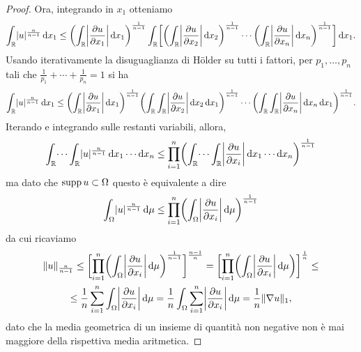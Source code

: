 \begin{proof}
    Ora, integrando in $x_1$ otteniamo
    \begin{equation}
        \int_\R\abs{u}^\frac{n}{n-1}\,\dd x_1\le
        \biggl(\int_\R\abs[\bigg]{\drp{u}{x_1}}\,\dd x_1\biggr)^\frac1{n-1}
        \int_\R\biggl[
            \biggl(\int_\R\abs[\bigg]{\drp{u}{x_2}}\,\dd x_2\biggr)^\frac1{n-1}
            \dotsm
            \biggl(\int_\R\abs[\bigg]{\drp{u}{x_n}}\,\dd x_n\biggr)^\frac1{n-1}
        \biggr]\,\dd x_1.
    \end{equation}
    Usando iterativamente la disuguaglianza di Hölder su tutti i fattori, per $p_1,\dotsc,p_n$ tali che $\frac1{p_1}+\dotsb+\frac1{p_n}=1$ si ha
    \begin{equation}
        \int_\R\abs{u}^\frac{n}{n-1}\,\dd x_1\le
        \biggl(\int_\R\abs[\bigg]{\drp{u}{x_1}}\,\dd x_1\biggr)^\frac1{n-1}
        \biggl(\int_\R\int_\R\abs[\bigg]{\drp{u}{x_2}}\,\dd x_2\,\dd x_1\biggr)^\frac1{n-1}
        \dotsm
        \biggl(\int_\R\int_\R\abs[\bigg]{\drp{u}{x_n}}\,\dd x_n\,\dd x_1\biggr)^\frac1{n-1}.
    \end{equation}
    Iterando e integrando sulle restanti variabili, allora,
    \begin{equation}
        \int_\R\dotsi\int_\R\abs{u}^\frac{n}{n-1}\,\dd x_1\dotsm\dd x_n\le
        \prod_{i=1}^n\biggl(\int_\R\dotsi\int_\R\abs[\bigg]{\drp{u}{x_i}}\,\dd x_1\dotsm\dd x_n\biggr)^\frac1{n-1}
    \end{equation}
    ma dato che $\supp u\subset\Omega$ questo è equivalente a dire
    \begin{equation}
        \int_\Omega\abs{u}^\frac{n}{n-1}\,\dd\mu\le
        \prod_{i=1}^n\biggl(\int_\Omega\abs[\bigg]{\drp{u}{x_i}}\,\dd\mu\biggr)^\frac1{n-1}
    \end{equation}
    da cui ricaviamo
    \begin{multline}
        \norm{u}_\frac{n}{n-1}\le
        \biggl[\prod_{i=1}^n\biggl(\int_\Omega\abs[\bigg]{\drp{u}{x_i}}\,\dd\mu\biggr)^\frac1{n-1}\biggr]^\frac{n-1}{n}=
        \biggl[\prod_{i=1}^n\biggl(\int_\Omega\abs[\bigg]{\drp{u}{x_i}}\,\dd\mu\biggr)\biggr]^\frac1{n}\le\\ \le
        \frac1{n}\sum_{i=1}^n\int_\Omega\abs[\bigg]{\drp{u}{x_i}}\,\dd\mu=
        \frac1{n}\int_\Omega\sum_{i=1}^n\abs[\bigg]{\drp{u}{x_i}}\,\dd\mu=
        \frac1{n}\norm{\grad u}_1,
    \end{multline}
    dato che la media geometrica di un insieme di quantità non negative non è mai maggiore della rispettiva media aritmetica.


\end{proof}
